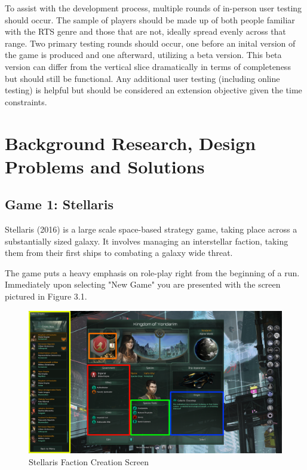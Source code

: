 \documentclass{report}
\begin{document}
To assist with the development process, multiple rounds of in-person user testing should occur. The sample of players should be made up of both people familiar with the RTS genre and those that are not, ideally spread evenly across that range. Two primary testing rounds should occur, one before an inital version of the game is produced and one afterward, utilizing a beta version. This beta version can differ from the vertical slice dramatically in terms of completeness but should still be functional.
Any additional user testing (including online testing) is helpful but should be considered an extension objective given the time constraints.

\pagebreak
\section{Background Research, Design Problems and Solutions}

\subsection{Game 1: Stellaris}

Stellaris (2016) is a large scale space-based strategy game, taking place across a substantially sized galaxy. It involves managing an interstellar faction, taking them from their first ships to combating a galaxy wide threat. 

The game puts a heavy emphasis on role-play right from the beginning of a run. Immediately upon selecting "New Game" you are presented with the screen pictured in Figure 3.1.

\begin{figure}[h]
    \includegraphics[width=\textwidth]{stellaris_faction_creation.png}
    \caption{Stellaris Faction Creation Screen}
\end{figure}
\end{document}

